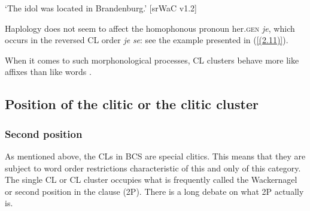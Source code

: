 \begin{exe}\ex
\begin{xlist}
\end{xlist}
\glt ‘The idol was located in Brandenburg.’
\hfill [srWaC v1.2]
\end{exe}

\noindent Haplo­logy does not seem to affect the homophonous pronoun her.\textsc{gen} \textit{je}, which occurs in the reversed CL order \textit{je} \textit{se}: see the example presented in (\ref{(2.11)}). 


\noindent When it comes to such morphonological processes, CL clusters behave more like affixes than like words \citep[121f]{SpencerLuis12}.

\subsection{Position of the clitic or the clitic cluster}
\label{Position of the clitic or the clitic cluster}

\subsubsection{Second position}
\label{Second position}
As mentioned above, the CLs in BCS are special clitics. This means that they are subject to word order restrictions characteristic of this and only of this category. The single CL or CL cluster occupies what is frequently called the Wackernagel or second position in the clause (2P). There is a long debate on what 2P actually is.

